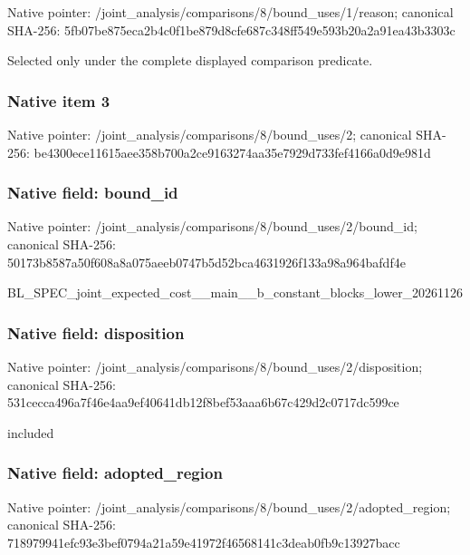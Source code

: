 \documentclass[10pt,a4paper]{article}
\begin{document}
Native pointer: /joint\_analysis/comparis\allowbreak{}ons/8/bound\_uses/1/reaso\allowbreak{}n; canonical SHA-256: 5fb07be875eca2b4c0f1be87\allowbreak{}9d8cfe687c348ff549e593b2\allowbreak{}0a2a91ea43b3303c


Selected only under the complete displayed comparison predicate.


\subsubsection{Native item 3}


Native pointer: /joint\_analysis/comparis\allowbreak{}ons/8/bound\_uses/2; canonical SHA-256: be4300ece11615aee358b700\allowbreak{}a2ce9163274aa35e7929d733\allowbreak{}fef4166a0d9e981d



\subsubsection{Native field: bound\_id}


Native pointer: /joint\_analysis/comparis\allowbreak{}ons/8/bound\_uses/2/bound\allowbreak{}\_id; canonical SHA-256: 50173b8587a50f608a8a075a\allowbreak{}eeb0747b5d52bca4631926f1\allowbreak{}33a98a964bafdf4e


BL\_SPEC\_joint\_expected\_c\allowbreak{}ost\_\_main\_\_b\_constant\_bl\allowbreak{}ocks\_lower\_20261126


\subsubsection{Native field: disposition}


Native pointer: /joint\_analysis/comparis\allowbreak{}ons/8/bound\_uses/2/dispo\allowbreak{}sition; canonical SHA-256: 531cecca496a7f46e4aa9ef4\allowbreak{}0641db12f8bef53aaa6b67c4\allowbreak{}29d2c0717dc599ce


included


\subsubsection{Native field: adopted\_region}


Native pointer: /joint\_analysis/comparis\allowbreak{}ons/8/bound\_uses/2/adopt\allowbreak{}ed\_region; canonical SHA-256: 718979941efc93e3bef0794a\allowbreak{}21a59e41972f46568141c3de\allowbreak{}ab0fb9c13927bacc
\end{document}
